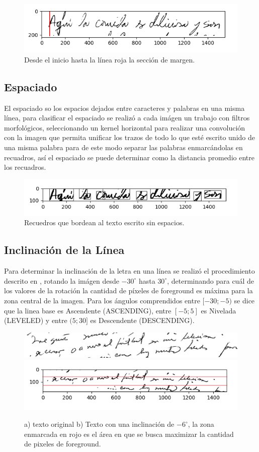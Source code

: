 \documentclass[10pt, a4paper]{article}
\begin{document}
\begin{figure}[!h]
    \centering
    \includegraphics[width = 0.5\linewidth]{Margin.png}
    \caption{Desde el inicio hasta la l\'inea roja la secci\'on de margen.}
\end{figure}
\subsection{Espaciado} 

El espaciado so los espacios dejados entre caracteres y palabras en una misma l\'inea, para clasificar el espaciado se realiz\'o a cada im\'agen un trabajo con filtros morfol\'ogicos, seleccionando un kernel horizontal para realizar una convoluci\'on con la imagen 
que permita unificar los trazos de todo lo que est\'e escrito unido de una misma palabra para de este modo separar las palabras enmarc\'andolas en recuadros, as\'i el espaciado se puede determinar como la distancia promedio entre los recuadros.

\begin{figure}[!h]
    \centering
    \includegraphics[width = 0.5\linewidth]{Espaces.png}
    \caption{Recuedros que bordean al texto escrito sin espacios.}
\end{figure}

\subsection{Inclinaci\'on de la L\'inea}
Para determinar la inclinaci\'on de la letra en una l\'inea se realiz\'o el procedimiento descrito en \cite{20}, rotando la im\'agen desde $-30^{\circ}$ hasta $30^{\circ}$, 
determinando para cu\'al de los valores de la rotaci\'on la cantidad de p\'ixeles de foreground es m\'axima para la zona central de la imagen. Para los \'angulos comprendidos 
entre $ [-30; -5) $ se dice que la linea base es Ascendente (ASCENDING), entre $[-5; 5]$ es Nivelada (LEVELED) y entre $(5; 30]$ es Descendente (DESCENDING). 

\begin{figure}[!h]
    \centering
    \includegraphics[width = 0.4\linewidth]{Judith_21.jpg}
    \includegraphics[width = 0.4\linewidth]{Baseline.png}
    \caption{a) texto original b) Texto con una inclinaci\'on de $-6^{\circ}$, la zona enmarcada en rojo es el \'area en que se busca maximizar 
    la cantidad de pixeles de foreground.}
\end{figure}
\end{document}
